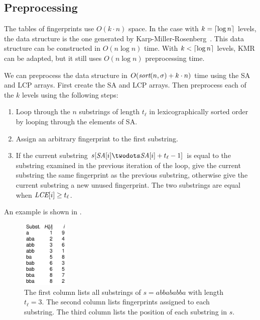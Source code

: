\documentclass[a4]{article}
\newcommand*{\pref}{\prettyref}
\begin{document}
\subsection{Preprocessing}

The tables of fingerprints use $O(k\cdot n)$ space. In the case with $k=\lceil\log n\rceil$ levels, the data structure is the one generated by Karp-Miller-Rosenberg~\cite{karp-miller-rosenberg}. This data structure can be constructed in $O(n\log n)$ time. With $k<\lceil\log n\rceil$ levels, KMR can be adapted, but it still uses $O(n\log n)$ preprocessing time.

We can preprocess the data structure in $O(\textit{sort}(n,\sigma) + k\cdot n)$ time using the SA and LCP arrays. First create the SA and LCP arrays. Then preprocess each of the $k$ levels using the following steps:
\begin{samepage}
\begin{enumerate}
\item Loop through the $n$ substrings of length $t_\ell$ in lexicographically sorted order by looping through the elements of SA.
\item Assign an arbitrary fingerprint to the first substring.
\item If the current substring $s[\SA[i]\twodots\SA[i]+t_\ell-1]$ is equal to the substring examined in the previous iteration of the loop, give the current substring the same fingerprint as the previous substring, otherwise give the current substring a new unused fingerprint. The two substrings are equal when $\textit{LCE}[i] \geq t_\ell$.
\end{enumerate}

An example is shown in \pref{fig:fingerprint-preproc}.
\end{samepage}

\begin{figure}[tp]
    \begin{center}
        \includegraphics[width=0.2\textwidth,page=1]{../doc/fingerprint-preproc.pdf}
    \end{center}
    \caption{\label{fig:fingerprint-preproc}The first column lists all substrings of $s=abbababba$ with length $t_\ell = 3$. The second column lists fingerprints assigned to each substring. The third column lists the position of each substring in $s$.}
\end{figure}
\end{document}
